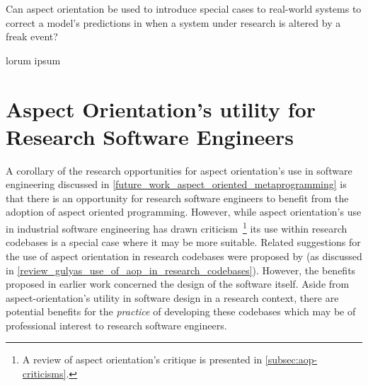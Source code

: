 \begin{researchquestion}
Can aspect orientation be used to introduce special cases to real-world systems
to correct a model's predictions in when a system under research is altered by a
freak event?
\end{researchquestion}

lorum  ipsum


\section{Aspect Orientation's utility for Research Software Engineers}
\label{future_work_aop_for_rses}

A corollary of the research opportunities for aspect orientation's use in
software engineering discussed in
\cref{future_work_aspect_oriented_metaprogramming} is that there is an
opportunity for research software engineers to benefit from the adoption of
aspect oriented programming. However, while aspect orientation's use in
industrial software engineering has drawn
criticism~\cite{steimann06paradoxical,przybylek2010wrong,Constantinides04aopconsidered}\footnote{A
review of aspect orientation's critique is presented in
\cref{subsec:aop-criticisms}.} its use within research codebases is a special
case where it may be more suitable. Related suggestions for the use of aspect
orientation in research codebases were proposed by \citeauthor{gulyas1999use}
(as discussed in \cref{review_gulyas_use_of_aop_in_research_codebases}).
However, the benefits proposed in earlier work concerned the design of the
software itself. Aside from aspect-orientation's utility in software design in a
research context, there are potential benefits for the \emph{practice} of
developing these codebases which may be of professional interest to research
software engineers.







